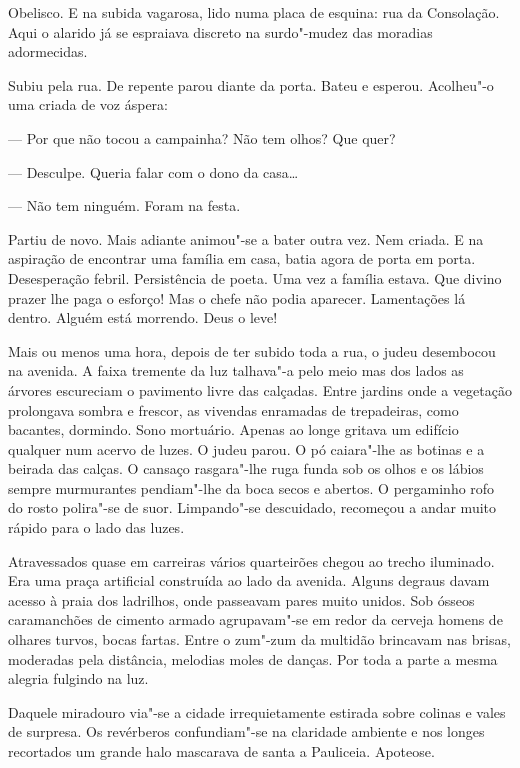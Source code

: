 \begin{linenumbers}
Obelisco. E na subida vagarosa, lido numa placa de esquina: rua da
Consolação. Aqui o alarido já se espraiava discreto na surdo"-mudez das
moradias adormecidas.

Subiu pela rua. De repente parou diante da porta. Bateu e esperou.
Acolheu"-o uma criada de voz áspera:

--- Por que não tocou a campainha? Não tem olhos? Que quer?

--- Desculpe. Queria falar com o dono da casa\ldots{}

--- Não tem ninguém. Foram na festa.

Partiu de novo. Mais adiante animou"-se a bater outra vez. Nem criada. E
na aspiração de encontrar uma família em casa, batia agora de porta em
porta. Desesperação febril. Persistência de poeta. Uma vez a família
estava. Que divino prazer lhe paga o esforço! Mas o chefe não podia
aparecer. Lamentações lá dentro. Alguém está morrendo. Deus o leve!

Mais ou menos uma hora, depois de ter subido toda a rua, o judeu
desembocou na avenida. A faixa tremente da luz talhava"-a pelo meio mas
dos lados as árvores escureciam o pavimento livre das calçadas. Entre
jardins onde a vegetação prolongava sombra e frescor, as vivendas
enramadas de trepadeiras, como bacantes, dormindo. Sono mortuário.
Apenas ao longe gritava um edifício qualquer num acervo de luzes. O
judeu parou. O pó caiara"-lhe as botinas e a beirada das calças. O
cansaço rasgara"-lhe ruga funda sob os olhos e os lábios sempre
murmurantes pendiam"-lhe da boca secos e abertos. O pergaminho rofo do
rosto polira"-se de suor. Limpando"-se descuidado, recomeçou a andar muito
rápido para o lado das luzes.

Atravessados quase em carreiras vários quarteirões chegou ao trecho
iluminado. Era uma praça artificial construída ao lado da avenida.
Alguns degraus davam acesso à praia dos ladrilhos, onde passeavam pares
muito unidos. Sob ósseos caramanchões de cimento armado agrupavam"-se em
redor da cerveja homens de olhares turvos, bocas fartas. Entre o zum"-zum
da multidão brincavam nas brisas, moderadas pela distância, melodias
moles de danças. Por toda a parte a mesma alegria fulgindo na luz.

Daquele miradouro via"-se a cidade irrequietamente estirada sobre colinas
e vales de surpresa. Os revérberos confundiam"-se na claridade ambiente e
nos longes recortados um grande halo mascarava de santa a Pauliceia.
Apoteose.


\end{linenumbers}
